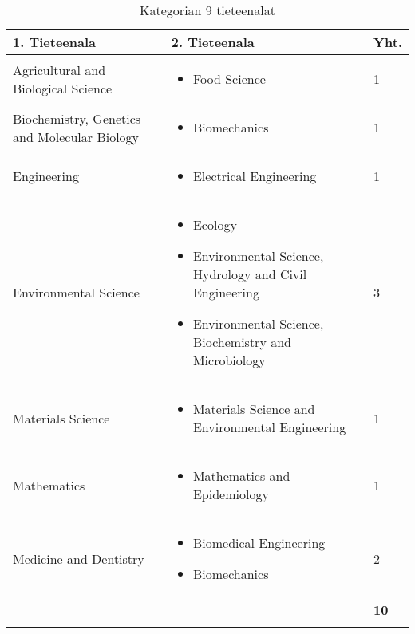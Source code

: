 \documentclass[utf8]{gradu3}
\begin{document}
\begin{longtable}[h]{|p{5cm}|p{8cm}|p{1cm}|}
    \hline
    \textbf{1. Tieteenala}    & \textbf{2. Tieteenala} & \textbf{Yht.} \\
    \hline
    Agricultural and Biological Science  & \begin{itemize}
        \item Food Science
    \end{itemize} & 1 \\
    \hline
    Biochemistry, Genetics and Molecular Biology & \begin{itemize}
        \item Biomechanics
    \end{itemize} & 1 \\
    \hline
    Engineering & \begin{itemize}
        \item Electrical Engineering
    \end{itemize} & 1 \\
    \hline
    Environmental Science & \begin{itemize}[noitemsep, topsep=0pt]
        \item Ecology
        \item Environmental Science, Hydrology and Civil Engineering
        \item Environmental Science, Biochemistry and Microbiology
    \end{itemize} & 3 \\
    \hline
    Materials Science & \begin{itemize}
        \item Materials Science and Environmental Engineering
    \end{itemize} & 1 \\
    \hline
    Mathematics & \begin{itemize}
        \item Mathematics and Epidemiology
    \end{itemize} & 1 \\
    \hline
    Medicine and Dentistry & \begin{itemize}
        \item Biomedical Engineering
        \item Biomechanics
    \end{itemize} & 2 \\
    \hline
       &   & \textbf{10} \\
    \hline
    \caption{Kategorian 9 tieteenalat}
    \label{table:Kategorian 9 tieteenalat}
\end{longtable}
\end{document}
